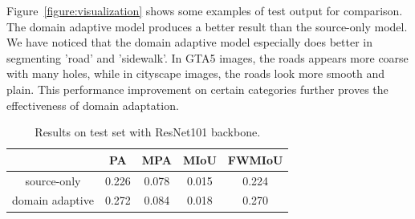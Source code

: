 Figure~\ref{figure:visualization} shows some examples of test output for comparison. The domain adaptive model produces a better result than the source-only model. We have noticed that the domain adaptive model especially does better in segmenting 'road' and 'sidewalk'. In GTA5 images, the roads appears more coarse with many holes, while in cityscape images, the roads look more smooth and plain. This performance improvement on certain categories further proves the effectiveness of domain adaptation.

\begin{table}[]
    \centering
    \begin{tabular}{c|c|c|c|c}
    \hline      &  \textbf{PA} & \textbf{MPA} & \textbf{MIoU} & \textbf{FWMIoU} \\
    \hline     source-only & 0.226 & 0.078 & 0.015 & 0.224\\
    \hline     domain adaptive & 0.272 & 0.084 & 0.018 & 0.270\\
    \hline
    \end{tabular}
    \caption{Results on test set with ResNet101 backbone.}
    \label{tab:table2}
\end{table}

